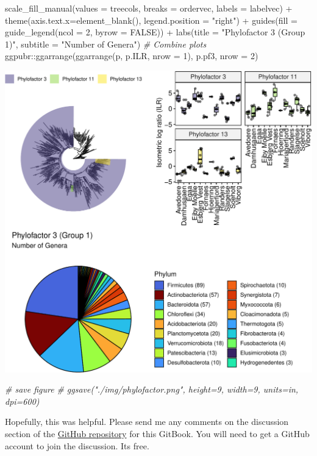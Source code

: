 \documentclass[
]{book}
\newenvironment{Shaded}{\begin{snugshade}}{\end{snugshade}}
\newcommand{\AttributeTok}[1]{\textcolor[rgb]{0.77,0.63,0.00}{#1}}
\newcommand{\CommentTok}[1]{\textcolor[rgb]{0.56,0.35,0.01}{\textit{#1}}}
\newcommand{\ConstantTok}[1]{\textcolor[rgb]{0.00,0.00,0.00}{#1}}
\newcommand{\DecValTok}[1]{\textcolor[rgb]{0.00,0.00,0.81}{#1}}
\newcommand{\FunctionTok}[1]{\textcolor[rgb]{0.00,0.00,0.00}{#1}}
\newcommand{\NormalTok}[1]{#1}
\newcommand{\SpecialCharTok}[1]{\textcolor[rgb]{0.00,0.00,0.00}{#1}}
\newcommand{\StringTok}[1]{\textcolor[rgb]{0.31,0.60,0.02}{#1}}
\begin{document}
\begin{Shaded}
\begin{Highlighting}[]
  \FunctionTok{scale\_fill\_manual}\NormalTok{(}\AttributeTok{values =}\NormalTok{ treecols, }
                    \AttributeTok{breaks =}\NormalTok{ ordervec,}
                    \AttributeTok{labels =}\NormalTok{ labelvec) }\SpecialCharTok{+}
  \FunctionTok{theme}\NormalTok{(}\AttributeTok{axis.text.x=}\FunctionTok{element\_blank}\NormalTok{(),}
        \AttributeTok{legend.position =} \StringTok{"right"}\NormalTok{) }\SpecialCharTok{+}
  \FunctionTok{guides}\NormalTok{(}\AttributeTok{fill =} \FunctionTok{guide\_legend}\NormalTok{(}\AttributeTok{ncol =} \DecValTok{2}\NormalTok{, }\AttributeTok{byrow =} \ConstantTok{FALSE}\NormalTok{)) }\SpecialCharTok{+}
  \FunctionTok{labs}\NormalTok{(}\AttributeTok{title =} \StringTok{"Phylofactor 3 (Group 1)"}\NormalTok{, }\AttributeTok{subtitle =} \StringTok{"Number of Genera"}\NormalTok{) }
\CommentTok{\# Combine plots}
\NormalTok{ggpubr}\SpecialCharTok{::}\FunctionTok{ggarrange}\NormalTok{(}\FunctionTok{ggarrange}\NormalTok{(p, p.ILR, }\AttributeTok{nrow =} \DecValTok{1}\NormalTok{),}
\NormalTok{                  p.pf3, }\AttributeTok{nrow =} \DecValTok{2}\NormalTok{)}
\end{Highlighting}
\end{Shaded}

\includegraphics{gitbook-demo_files/figure-latex/taxafiltering-1.pdf}

\begin{Shaded}
\begin{Highlighting}[]
\CommentTok{\# save figure }
\CommentTok{\# ggsave("./img/phylofactor.png", height=9, width=9, units=\textquotesingle{}in\textquotesingle{}, dpi=600)}
\end{Highlighting}
\end{Shaded}

Hopefully, this was helpful. Please send me any comments on the discussion section of the \href{https://github.com/chrismitbiz/ABlab-workflows/discussions/}{GitHub repository} for this GitBook. You will need to get a GitHub account to join the discussion. Its free.

  
\end{document}
